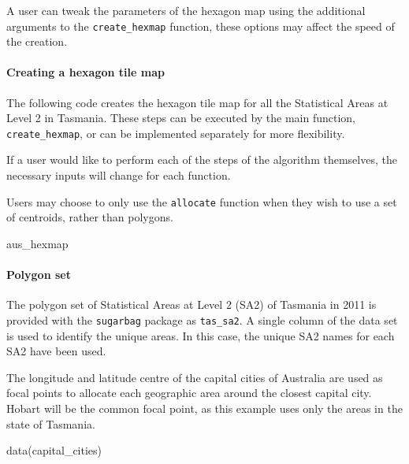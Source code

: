A user can tweak the parameters of the hexagon map using the additional
arguments to the \texttt{create\_hexmap} function, these options may
affect the speed of the creation.

\hypertarget{creating-a-hexagon-tile-map}{%
\paragraph{Creating a hexagon tile
map}\label{creating-a-hexagon-tile-map}}

The following code creates the hexagon tile map for all the Statistical
Areas at Level 2 in Tasmania. These steps can be executed by the main
function, \texttt{create\_hexmap}, or can be implemented separately for
more flexibility.

If a user would like to perform each of the steps of the algorithm
themselves, the necessary inputs will change for each function.

Users may choose to only use the \texttt{allocate} function when they
wish to use a set of centroids, rather than \citep{sf} polygons.

\begin{Schunk}
\begin{Sinput}
aus_hexmap
\end{Sinput}
\end{Schunk}

\hypertarget{polygon-set}{%
\paragraph{Polygon set}\label{polygon-set}}

The polygon set of Statistical Areas at Level 2 (SA2) \citep{abs2011} of
Tasmania in 2011 is provided with the \texttt{sugarbag} package as
\texttt{tas\_sa2}. A single column of the data set is used to identify
the unique areas. In this case, the unique SA2 names for each SA2 have
been used.

The longitude and latitude centre of the capital cities of Australia are
used as focal points to allocate each geographic area around the closest
capital city. Hobart will be the common focal point, as this example
uses only the areas in the state of Tasmania.

\begin{Schunk}
\begin{Sinput}
data(capital_cities)
\end{Sinput}
\end{Schunk}

